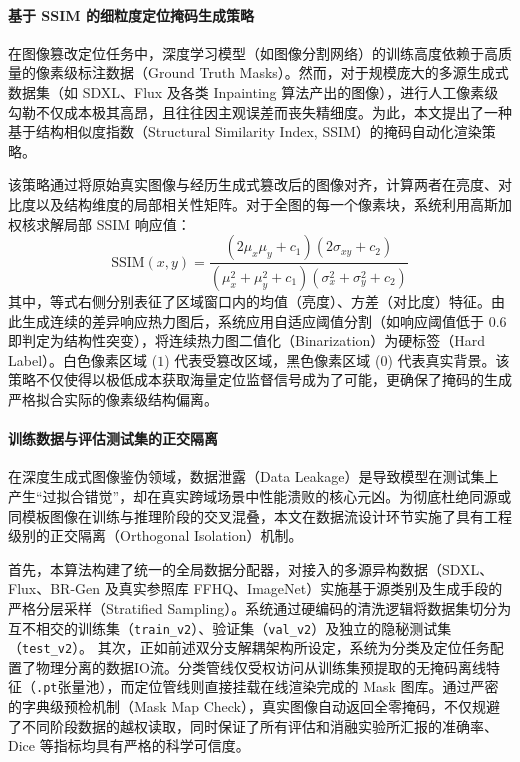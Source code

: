 \documentclass[10pt,a4paper,twocolumn]{ctexart}
\begin{document}
\paragraph{基于 SSIM 的细粒度定位掩码生成策略}
在图像篡改定位任务中，深度学习模型（如图像分割网络）的训练高度依赖于高质量的像素级标注数据（Ground Truth Masks）。然而，对于规模庞大的多源生成式数据集（如 SDXL、Flux 及各类 Inpainting 算法产出的图像），进行人工像素级勾勒不仅成本极其高昂，且往往因主观误差而丧失精细度。为此，本文提出了一种基于结构相似度指数（Structural Similarity Index, SSIM）的掩码自动化渲染策略。

该策略通过将原始真实图像与经历生成式篡改后的图像对齐，计算两者在亮度、对比度以及结构维度的局部相关性矩阵。对于全图的每一个像素块，系统利用高斯加权核求解局部 SSIM 响应值：
\begin{equation}
    \text{SSIM}(x, y) = \frac{(2\mu_x\mu_y + c_1)(2\sigma_{xy} + c_2)}{(\mu_x^2 + \mu_y^2 + c_1)(\sigma_x^2 + \sigma_y^2 + c_2)}
\end{equation}
其中，等式右侧分别表征了区域窗口内的均值（亮度）、方差（对比度）特征。由此生成连续的差异响应热力图后，系统应用自适应阈值分割（如响应阈值低于 $0.6$ 即判定为结构性突变），将连续热力图二值化（Binarization）为硬标签（Hard Label）。白色像素区域 ($1$) 代表受篡改区域，黑色像素区域 ($0$) 代表真实背景。该策略不仅使得以极低成本获取海量定位监督信号成为了可能，更确保了掩码的生成严格拟合实际的像素级结构偏离。

\paragraph{训练数据与评估测试集的正交隔离}
在深度生成式图像鉴伪领域，数据泄露（Data Leakage）是导致模型在测试集上产生“过拟合错觉”，却在真实跨域场景中性能溃败的核心元凶。为彻底杜绝同源或同模板图像在训练与推理阶段的交叉混叠，本文在数据流设计环节实施了具有工程级别的正交隔离（Orthogonal Isolation）机制。

首先，本算法构建了统一的全局数据分配器，对接入的多源异构数据（SDXL、Flux、BR-Gen 及真实参照库 FFHQ、ImageNet）实施基于源类别及生成手段的严格分层采样（Stratified Sampling）。系统通过硬编码的清洗逻辑将数据集切分为互不相交的训练集（\texttt{train\_v2}）、验证集（\texttt{val\_v2}）及独立的隐秘测试集（\texttt{test\_v2}）。
其次，正如前述双分支解耦架构所设定，系统为分类及定位任务配置了物理分离的数据IO流。分类管线仅受权访问从训练集预提取的无掩码离线特征（\texttt{.pt}张量池），而定位管线则直接挂载在线渲染完成的 Mask 图库。通过严密的字典级预检机制（Mask Map Check），真实图像自动返回全零掩码，不仅规避了不同阶段数据的越权读取，同时保证了所有评估和消融实验所汇报的准确率、Dice 等指标均具有严格的科学可信度。
\end{document}
